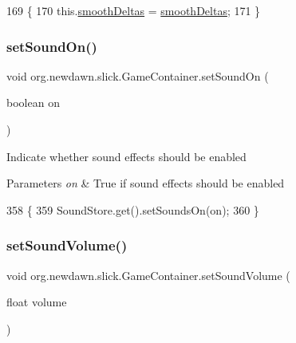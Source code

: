 \begin{DoxyCode}
169                                                       \{
170         this.\mbox{\hyperlink{classorg_1_1newdawn_1_1slick_1_1_game_container_ae27109ea0f24484683365b54667b2825}{smoothDeltas}} = \mbox{\hyperlink{classorg_1_1newdawn_1_1slick_1_1_game_container_ae27109ea0f24484683365b54667b2825}{smoothDeltas}};
171     \}
\end{DoxyCode}
\mbox{\label{classorg_1_1newdawn_1_1slick_1_1_game_container_aae73dc91d9a1d1542f77d70f38b7f400}} 
\subsubsection{\texorpdfstring{set\+Sound\+On()}{setSoundOn()}}
{\footnotesize\ttfamily void org.\+newdawn.\+slick.\+Game\+Container.\+set\+Sound\+On (\begin{DoxyParamCaption}\item[{boolean}]{on }\end{DoxyParamCaption})\hspace{0.3cm}{\ttfamily [inline]}}

Indicate whether sound effects should be enabled


\begin{DoxyParams}{Parameters}
{\em on} & True if sound effects should be enabled \\
\hline
\end{DoxyParams}

\begin{DoxyCode}
358                                        \{
359         SoundStore.get().setSoundsOn(on);
360     \}
\end{DoxyCode}
\mbox{\label{classorg_1_1newdawn_1_1slick_1_1_game_container_aa023e8d1edafe3d1a57a04d32e85dc9f}} 
\subsubsection{\texorpdfstring{set\+Sound\+Volume()}{setSoundVolume()}}
{\footnotesize\ttfamily void org.\+newdawn.\+slick.\+Game\+Container.\+set\+Sound\+Volume (\begin{DoxyParamCaption}\item[{float}]{volume }\end{DoxyParamCaption})\hspace{0.3cm}{\ttfamily [inline]}}

